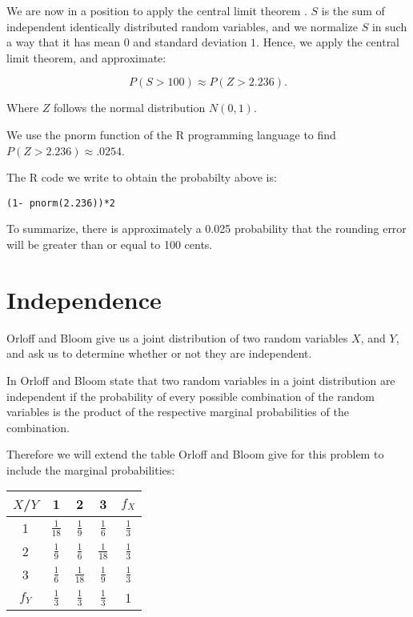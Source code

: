 \documentclass[a5paper,11pt]{article}
\begin{document}
We are now in a position to apply the
central limit theorem \cite{reading6b}. 
$S$ is the sum of
independent identically distributed
random variables, and we normalize $S$ in 
such a way that it has mean $0$ and
standard deviation $1$. Hence, we apply
the central limit theorem, and approximate:

\begin{equation}
P\left(S > 100 \right) \approx
P \left(Z > 2.236 \right).
\end{equation}

Where $Z$ follows the normal distribution
$N\left(0,1 \right)$.

We use the pnorm function of the R 
programming language to find 
$P \left(Z > 2.236 \right) 
\approx .0254$.

The R code we write to obtain the 
probabilty above is:
\begin{lstlisting}
(1- pnorm(2.236))*2
\end{lstlisting}

To summarize, there is approximately
a 0.025 probability that the rounding
error will be greater than or equal to
100 cents.

\section{Independence}
Orloff and Bloom give us a joint distribution of two random  variables
$X$, and $Y$, and ask us to determine whether or not they are independent.

In \cite{reading7} Orloff and Bloom state 
that two random variables in a joint
distribution are independent if the
probability of every possible combination
of the random variables is the product
of the respective marginal probabilities of
the combination.

Therefore we will extend the table Orloff
and Bloom give for this problem to
include the marginal probabilities:


\begin{center}
\begin{tabular}{ | c | c | c | c  | c | }
    \hline
    $X$/$Y$ & 1 & 2 & 3 & $f_X$ \\ \hline
    1 & $\frac{1}{18}$ & $\frac{1}{9}$ & $\frac{1}{6}$ & $\frac{1}{3}$ \\ \hline
    2 & $\frac{1}{9}$ & $\frac{1}{6}$ & $\frac{1}{18}$ & $\frac{1}{3}$ \\ \hline
    3 & $\frac{1}{6}$ & $\frac{1}{18}$ & $\frac{1}{9}$ & $\frac{1}{3}$ \\ \hline
    $f_Y$ & $\frac{1}{3}$ & $\frac{1}{3}$ & $\frac{1}{3}$ & 1 \\ \hline
  \end{tabular}
\end{center}
\end{document}
